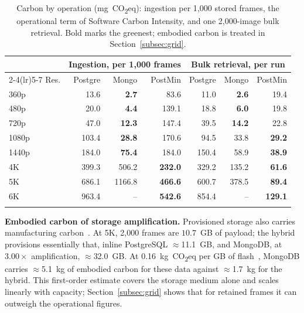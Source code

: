 \documentclass[pdflatex,sn-basic]{sn-jnl}%
\begin{document}
\begin{table}[htbp]
\color{markup}
\caption{Carbon by operation (mg~CO\textsubscript{2}eq): ingestion per 1{,}000 stored frames, the operational term of Software Carbon Intensity, and one 2{,}000-image bulk retrieval. Bold marks the greenest; embodied carbon is treated in Section~\ref{subsec:grid}.}\label{tab:dimcarbon}\label{tab:sci}
\small
\setlength{\tabcolsep}{4pt}
\begin{tabular}{@{}lrrrrrr@{}}
\toprule
 & \multicolumn{3}{c}{Ingestion, per 1{,}000 frames} & \multicolumn{3}{c}{Bulk retrieval, per run} \\
\cmidrule(lr){2-4}\cmidrule(lr){5-7}
Res. & Postgre & Mongo & PostMin & Postgre & Mongo & PostMin \\
\midrule
360p  & 13.6 & \textbf{2.7} & 83.6 & 11.0 & \textbf{2.6} & 19.4 \\
480p  & 20.0 & \textbf{4.4} & 139.1 & 18.8 & \textbf{6.0} & 19.8 \\
720p  & 47.0 & \textbf{12.3} & 147.4 & 39.5 & \textbf{14.2} & 22.8 \\
1080p & 103.4 & \textbf{28.8} & 170.6 & 94.5 & 33.8 & \textbf{29.2} \\
1440p & 184.0 & \textbf{75.4} & 184.0 & 150.4 & 58.9 & \textbf{38.9} \\
4K    & 399.3 & 506.2 & \textbf{232.0} & 329.2 & 135.2 & \textbf{61.6} \\
5K    & 686.1 & 1166.8 & \textbf{466.6} & 600.7 & 378.5 & \textbf{89.4} \\
6K    & 963.4 & -- & \textbf{542.6} & 854.4 & -- & \textbf{129.1} \\
\botrule
\end{tabular}
\end{table}

{\color{markup}\textbf{Embodied carbon of storage amplification.} Provisioned storage also carries manufacturing carbon~\citep{gupta_chasing_carbon,tannu_ssd_embodied}.} {\color{markup}At 5K, 2{,}000 frames are $10.7$~GB of payload; the hybrid provisions essentially that, inline PostgreSQL $\approx$11.1~GB, and MongoDB, at $3.00\times$ amplification, $\approx$32.0~GB.} {\color{markup}At 0.16~kg~CO\textsubscript{2}eq per GB of flash~\citep{tannu_ssd_embodied}, MongoDB carries $\approx$5.1~kg of embodied carbon for these data against $\approx$1.7~kg for the hybrid.} {\color{markup}This first-order estimate covers the storage medium alone and scales linearly with capacity; Section~\ref{subsec:grid} shows that for retained frames it can outweigh the operational figures.}
\end{document}
